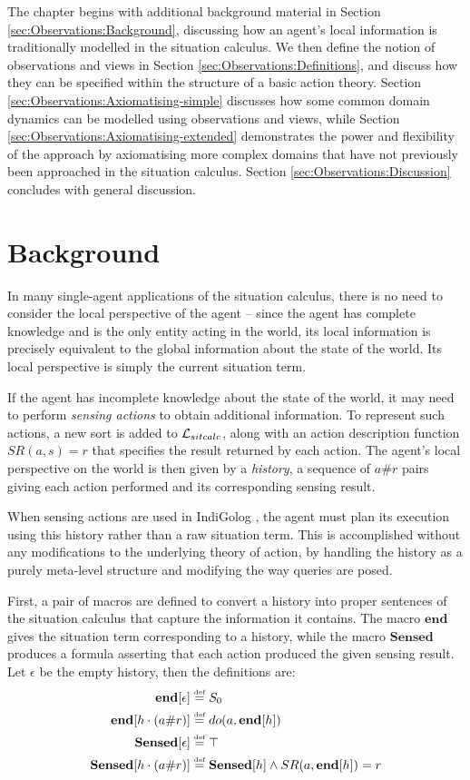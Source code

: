 The chapter begins with additional background material in Section
\ref{sec:Observations:Background}, discussing how an agent's local
information is traditionally modelled in the situation calculus. We
then define the notion of observations and views in Section \ref{sec:Observations:Definitions},
and discuss how they can be specified within the structure of a basic
action theory. Section \ref{sec:Observations:Axiomatising-simple}
discusses how some common domain dynamics can be modelled using observations
and views, while Section \ref{sec:Observations:Axiomatising-extended}
demonstrates the power and flexibility of the approach by axiomatising
more complex domains that have not previously been approached in the
situation calculus. Section \ref{sec:Observations:Discussion} concludes
with general discussion.


\section{Background\label{sec:Observations:Background}}

In many single-agent applications of the situation calculus, there
is no need to consider the local perspective of the agent -- since
the agent has complete knowledge and is the only entity acting in
the world, its local information is precisely equivalent to the global
information about the state of the world. Its local perspective is
simply the current situation term.

If the agent has incomplete knowledge about the state of the world,
it may need to perform \emph{sensing actions} to obtain additional
information. To represent such actions, a new sort is
added to $\mathcal{L}_{sitcalc}$, along with an action description
function $SR(a,s)=r$ that specifies the result returned by each action.
The agent's local perspective on the world is then given by a \emph{history},
a sequence of $a\#r$ pairs giving each action performed and its corresponding
sensing result.

When sensing actions are used in IndiGolog \citep{giacomo99indigolog},
the agent must plan its execution using this history rather than a
raw situation term. This is accomplished without any modifications
to the underlying theory of action, by handling the history as a purely
meta-level structure and modifying the way queries are posed.

First, a pair of macros are defined to convert a history into proper
sentences of the situation calculus that capture the information it
contains. The macro $\mathbf{end}$ gives the situation term corresponding
to a history, while the macro $\mathbf{Sensed}$ produces a formula
asserting that each action produced the given sensing result. Let
$\epsilon$ be the empty history, then the definitions are:\begin{alignat*}{1}
\mathbf{end}[\epsilon] & \stackrel{\mbox{\tiny def}}{=} S_{0}\\
\mathbf{end}[h\cdot(a\#r)] & \stackrel{\mbox{\tiny def}}{=} do(a,\mathbf{end}[h])\\
\mathbf{Sensed}[\epsilon] & \stackrel{\mbox{\tiny def}}{=}\top\\
\mathbf{Sensed}[h\cdot(a\#r)] & \stackrel{\mbox{\tiny def}}{=}\mathbf{Sensed}[h]\wedge SR(a,\mathbf{end}[h])=r\end{alignat*}


